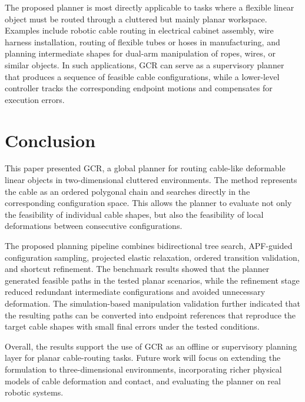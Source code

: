 \documentclass{pas}
\begin{document}
The proposed planner is most directly applicable to tasks where a flexible
linear object must be routed through a cluttered but mainly planar workspace.
Examples include robotic cable routing in electrical cabinet assembly, wire
harness installation, routing of flexible tubes or hoses in manufacturing, and
planning intermediate shapes for dual-arm manipulation of ropes, wires, or
similar objects. In such applications, GCR can serve as a supervisory planner
that produces a sequence of feasible cable configurations, while a lower-level
controller tracks the corresponding endpoint motions and compensates for
execution errors.

\section{Conclusion}
\label{sec:conclusion}

This paper presented GCR, a global planner for routing cable-like deformable
linear objects in two-dimensional cluttered environments. The method represents
the cable as an ordered polygonal chain and searches directly in the corresponding
configuration space. This allows the planner to evaluate not only the feasibility
of individual cable shapes, but also the feasibility of local deformations between
consecutive configurations.

The proposed planning pipeline combines bidirectional tree search, APF-guided
configuration sampling, projected elastic relaxation, ordered transition
validation, and shortcut refinement. The benchmark results showed that the
planner generated feasible paths in the tested planar scenarios, while the
refinement stage reduced redundant intermediate configurations and avoided
unnecessary deformation. The simulation-based manipulation validation further indicated that the resulting paths can be converted into endpoint references that reproduce the target cable shapes with small final errors under the tested conditions.

Overall, the results support the use of GCR as an offline or supervisory planning
layer for planar cable-routing tasks. Future work will focus on extending the
formulation to three-dimensional environments, incorporating richer physical
models of cable deformation and contact, and evaluating the planner on real
robotic systems.







\end{document}
